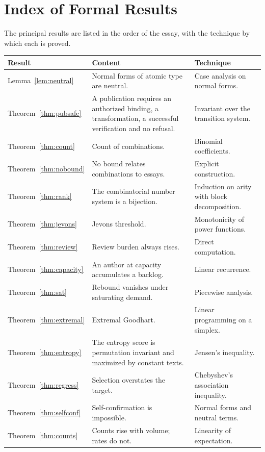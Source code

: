 \documentclass[11pt]{article}
\theoremstyle{plain}
\theoremstyle{definition}
\theoremstyle{remark}
\begin{document}
\section{Index of Formal Results}\label{app:index}

The principal results are listed in the order of the essay, with the technique by which each is proved.

\begin{longtable}{@{}p{}p{}p{}@{}}
\toprule
Result & Content & Technique \\
\midrule
\endhead
Lemma~\ref{lem:neutral} & Normal forms of atomic type are neutral. & Case analysis on normal forms. \\
Theorem~\ref{thm:pubsafe} & A publication requires an authorized binding, a transformation, a successful verification and no refusal. & Invariant over the transition system. \\
Theorem~\ref{thm:count} & Count of combinations. & Binomial coefficients. \\
Theorem~\ref{thm:nobound} & No bound relates combinations to essays. & Explicit construction. \\
Theorem~\ref{thm:rank} & The combinatorial number system is a bijection. & Induction on arity with block decomposition. \\
Theorem~\ref{thm:jevons} & Jevons threshold. & Monotonicity of power functions. \\
Theorem~\ref{thm:review} & Review burden always rises. & Direct computation. \\
Theorem~\ref{thm:capacity} & An author at capacity accumulates a backlog. & Linear recurrence. \\
Theorem~\ref{thm:sat} & Rebound vanishes under saturating demand. & Piecewise analysis. \\
Theorem~\ref{thm:extremal} & Extremal Goodhart. & Linear programming on a simplex. \\
Theorem~\ref{thm:entropy} & The entropy score is permutation invariant and maximized by constant texts. & Jensen's inequality. \\
Theorem~\ref{thm:regress} & Selection overstates the target. & Chebyshev's association inequality. \\
Theorem~\ref{thm:selfconf} & Self-confirmation is impossible. & Normal forms and neutral terms. \\
Theorem~\ref{thm:counts} & Counts rise with volume; rates do not. & Linearity of expectation. \\

\end{longtable}
\end{document}
